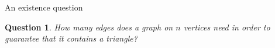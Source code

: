 \documentclass{beamer}
\theoremstyle{plain}
\newtheorem{question}[theorem]{Question}
\begin{document}
	\begin{frame}{An existence question}
		\begin{question}
			How many edges does a graph on $n$ vertices need in order to guarantee that it contains a triangle?
		\end{question}

		\pause

		\begin{figure}
			\centering
			\hspace{1in}\pause
		\end{figure}	
	\end{frame}
\end{document}
